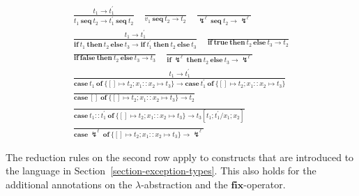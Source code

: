 \documentclass{llncs}
\newcommand{\RulX}[3]{\frac{#2}{#3}}
\newcommand{\SubstTwo}[5]{#5[#1;#3/#2;#4]}
\newcommand{\Tm}{t}
\newcommand{\TmVar}{x}
\newcommand{\TmVal}{v}
\newcommand{\TmTrue}{\mathbf{true}}
\newcommand{\TmFalse}{\mathbf{false}}
\newcommand{\TmIf}[3]{\mathbf{if}\ #1\ \mathbf{then}\ #2\ \mathbf{else}\ #3}
\newcommand{\TmCrash}[2]{\lightning_{#1}^{#2}}
\newcommand{\TmSeq}[2]{#1\ \mathbf{seq}\ #2}
\newcommand{\TmNil}[1]{\left[\right]_{#1}}
\newcommand{\TmCons}[2]{#1 :: #2}
\newcommand{\TmCase}[5]{\mathbf{case}\ #1\ \mathbf{of}\ \{\left[\right]\mapsto #2; #3 :: #4 \mapsto #5\}}
\newcommand{\ExnLbl}{\ell}
\newcommand{\JudgeEval}[2]{{#1 \longrightarrow #2}}
\begin{document}
\begin{gather*}
        \RulX{E-Seq$_1$}
             {\JudgeEval{\Tm_1}{\Tm_1^\prime}}
             {\JudgeEval{\TmSeq{\Tm_1}{\Tm_2}}{\TmSeq{\Tm_1^\prime}{\Tm_2}}}
        \quad
        \RulX{E-Seq$_2$}
             {}
             {\JudgeEval{\TmSeq{\TmVal_1}{\Tm_2}}{\Tm_2}}
        \quad
        \RulX{E-SeqExn}
             {}
             {\JudgeEval{\TmSeq{\TmCrash{}{\ExnLbl}}{\Tm_2}}{\TmCrash{}{\ExnLbl}}}
        \\[1.5ex]
        \RulX{E-If}
             {\JudgeEval{\Tm_1}{\Tm_1^\prime}}
             {\JudgeEval{\TmIf{\Tm_1}{\Tm_2}{\Tm_3}}{\TmIf{\Tm_1^\prime}{\Tm_2}{\Tm_3}}}
        \quad
        \RulX{E-IfTrue}
             {}
             {\JudgeEval{\TmIf{\TmTrue}{\Tm_2}{\Tm_3}}{\Tm_2}}
        \\[1.5ex]
        \RulX{E-IfFalse}
             {}
             {\JudgeEval{\TmIf{\TmFalse}{\Tm_2}{\Tm_3}}{\Tm_3}}
        \quad
        \RulX{E-IfExn}
             {}
             {\JudgeEval{\TmIf{\TmCrash{}{\ExnLbl}}{\Tm_2}{\Tm_3}}{\TmCrash{}{\ExnLbl}}}
        \\[1.5ex]
        \RulX{E-Case}
             {\JudgeEval{\Tm_1}{\Tm_1^\prime}}
             {\JudgeEval{\TmCase{\Tm_1}{\Tm_2}{\TmVar_1}{\TmVar_2}{\Tm_3}}
                        {\TmCase{\Tm_1^\prime}{\Tm_2}{\TmVar_1}{\TmVar_2}{\Tm_3}}
             }
        \\[1.5ex]
        \RulX{E-CaseNil}
             {}
             {\JudgeEval{\TmCase{\TmNil{}}{\Tm_2}{\TmVar_1}{\TmVar_2}{\Tm_3}}
                        {\Tm_2}
             }
        \\[1.5ex]
        \RulX{E-CaseCons}
             {}
             {\JudgeEval{\TmCase{\TmCons{\Tm_1}{\Tm_1^\prime}}{\Tm_2}{\TmVar_1}{\TmVar_2}{\Tm_3}}
                        {\SubstTwo{\Tm_1}{\TmVar_1}{\Tm_1^\prime}{\TmVar_2}{\Tm_3}}
             }
        \\[1.5ex]
        \RulX{E-CaseExn}
             {}
             {\JudgeEval{\TmCase{\TmCrash{}{\ExnLbl}}{\Tm_2}{\TmVar_1}{\TmVar_2}{\Tm_3}}
                        {\TmCrash{}{\ExnLbl}}
             }
    \end{gather*}

The reduction rules on the second row apply to constructs that are introduced to the language in Section~\ref{section-exception-types}. This also holds for the additional annotations on the $\lambda$-abstraction and the $\mathbf{fix}$-operator.
\end{document}
